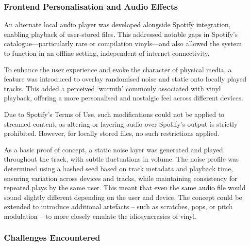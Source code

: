             \subsubsection{Frontend Personalisation and Audio Effects}
    
            An alternate local audio player was developed alongside Spotify integration, enabling playback of user-stored files. This addressed notable gaps in Spotify’s catalogue—particularly rare or compilation vinyls—and also allowed the system to function in an offline setting, independent of internet connectivity.
    
            To enhance the user experience and evoke the character of physical media, a feature was introduced to overlay randomised noise and static onto locally played tracks. This added a perceived ‘warmth’ commonly associated with vinyl playback, offering a more personalised and nostalgic feel across different devices.
            
            Due to Spotify’s Terms of Use, such modifications could not be applied to streamed content, as altering or layering audio over Spotify’s output is strictly prohibited. However, for locally stored files, no such restrictions applied.
            
            As a basic proof of concept, a static noise layer was generated and played throughout the track, with subtle fluctuations in volume. The noise profile was determined using a hashed seed based on track metadata and playback time, ensuring variation across devices and tracks, while maintaining consistency for repeated plays by the same user. This meant that even the same audio file would sound slightly different depending on the user and device. The concept could be extended to introduce additional artefacts -- such as scratches, pops, or pitch modulation -- to more closely emulate the idiosyncrasies of vinyl.
        
            \subsubsection{Challenges Encountered}
    
